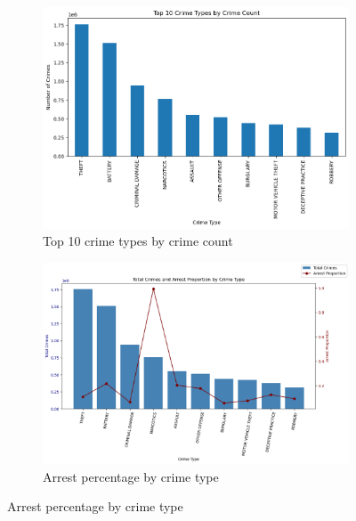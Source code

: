 \documentclass[12pt]{article}
\begin{document}
\begin{figure}[H]
    \centering
    \begin{subfigure}[t]{0.49\textwidth}
        \centering
        \includegraphics[width=\textwidth]{figures/crime_count_by_crime_type.png}
        \caption{Top 10 crime types by crime count}
        \label{fig:crime_count_by_crime_type}
    \end{subfigure}
    \hfill
    \begin{subfigure}[t]{0.49\textwidth}
        \centering
        \includegraphics[width=\textwidth]{figures/crime_type_by_arrest_proportion.png}
        \caption{Arrest percentage by crime type}
        \label{fig:crime_type_by_arrest_proportion}
    \end{subfigure}
   

\end{figure}
\end{document}
